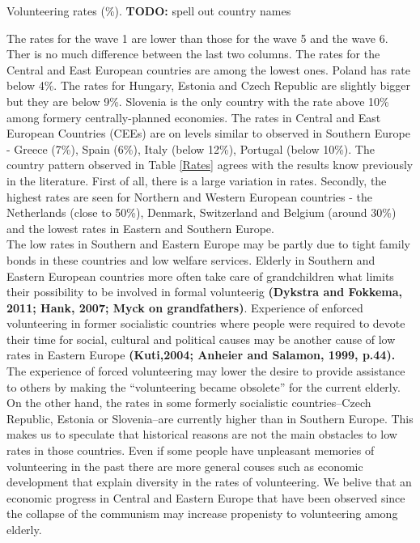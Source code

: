 \documentclass[10pt, letterpaper]{article}
\begin{document}
\begin{spacing}{1.4}
\begin{spacing}{.9}
\begin{table}[H]
\centering 
\caption{Volunteering rates (\%). {\bf TODO:} spell out country names}  
\begin{small} 
	 
      \label{Rates} 
\end{small}
\end{table}
\end{spacing}

The rates for the wave 1 are lower than those for the wave 5 and the wave 6. Ther is no much difference between the last two columns.  The rates for  the Central and East European countries are among the lowest ones.  Poland has rate below 4\%. The rates for Hungary, Estonia and Czech Republic are slightly bigger but they are below 9\%. Slovenia is the only country with the rate above 10\% among formery centrally-planned economies. The rates in Central and East European Countries (CEEs) are on levels similar to observed in Southern Europe - Greece (7\%), Spain (6\%), Italy (below 12\%), Portugal (below 10\%).  The country pattern observed in Table \ref{Rates} agrees with the results know previously in the literature. First of all, there is a large variation in rates. Secondly,  the highest rates are seen for  Northern and Western European countries - the Netherlands (close to 50\%), Denmark, Switzerland and Belgium (around 30\%) and the lowest rates in Eastern and Southern Europe. \\
The low rates in Southern and Eastern Europe may be partly due to tight family bonds in these countries and low welfare services. Elderly in Southern and Eastern European countries more often take care of grandchildren what limits their possibility to be involved in formal volunteerig \textbf{(Dykstra and Fokkema, 2011; Hank, 2007; Myck on grandfathers)}. Experience of  enforced volunteering  in former socialistic countries where people were required to devote their time for social, cultural and political causes may be another cause of low rates in Eastern Europe \textbf{(Kuti,2004; Anheier and Salamon, 1999, p.44).} The experience of forced volunteering  may lower the desire to provide assistance to others by making the “volunteering became obsolete” for the current elderly. On the other hand, the rates in some formerly socialistic countries--Czech Republic, Estonia or Slovenia--are currently higher than in Southern Europe. This makes us to speculate that historical reasons are not the main obstacles to low rates in those countries. Even if some people have unpleasant memories of volunteering in the past there are more general couses such as economic development that explain diversity in the rates of volunteering. We belive that an economic progress in Central and Eastern Europe that have been observed since the collapse of the communism may increase propenisty to volunteering among elderly. \\

\end{spacing}
\end{document}
